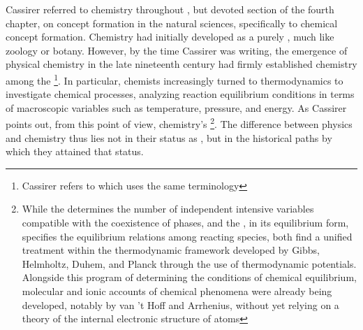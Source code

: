\documentclass[submitted,12pt]{article}
\providecommand{\DIFadd}[1]{{\protect\color{blue}\uwave{#1}}} %
\providecommand{\DIFaddbegin}{} %
\providecommand{\DIFaddend}{} %
\begin{document}
Cassirer referred to chemistry throughout \SFt, but devoted section  of the fourth chapter, on concept formation  in the natural sciences, specifically to chemical concept formation. Chemistry had initially developed as a purely , much like zoology or botany. However, by the time Cassirer was writing, the emergence of physical chemistry in the late nineteenth century had firmly established chemistry among the \footnote{Cassirer refers to \citet{Nernst1896}\DIFaddbegin \DIFadd{, }\DIFaddend which uses the same terminology\DIFaddbegin \DIFadd{.}\DIFaddend }. In particular, chemists increasingly turned to thermodynamics to investigate chemical processes, analyzing reaction equilibrium conditions in terms of macroscopic variables such as temperature, pressure, and energy. As Cassirer points out, from this point of view, chemistry's  \footnote{While the  determines the number of independent intensive variables compatible with the coexistence of phases, and the , in its equilibrium form, specifies the equilibrium relations among reacting species, both find a unified treatment within the thermodynamic framework developed by Gibbs, Helmholtz, Duhem, and Planck through the use of thermodynamic potentials. Alongside this program of determining the conditions of chemical equilibrium, molecular and ionic accounts of chemical phenomena were already being developed, notably by van 't Hoff and Arrhenius, without yet relying on a theory of the internal electronic structure of atoms\DIFaddbegin \DIFadd{.}\DIFaddend }. The difference between physics and chemistry thus lies not in their status as , but in the historical paths by which they attained that status. 
\end{document}
